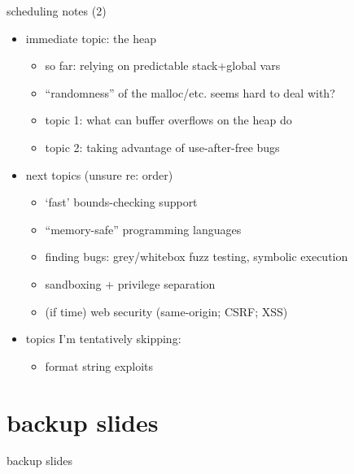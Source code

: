 \begin{frame}{scheduling notes (2)}
    \begin{itemize}
    \item immediate topic: the heap
        \begin{itemize}
        \item so far: relying on predictable stack+global vars
        \item ``randomness'' of the malloc/etc. seems hard to deal with?
        \item topic 1: what can buffer overflows on the heap do
        \item topic 2: taking advantage of use-after-free bugs
        \end{itemize}
    \item next topics (unsure re: order)
        \begin{itemize}
        \item `fast' bounds-checking support
        \item ``memory-safe'' programming languages
        \item finding bugs: grey/whitebox fuzz testing, symbolic execution
        \item sandboxing + privilege separation
        \item (if time) web security (same-origin; CSRF; XSS)
        \end{itemize}
    \item topics I'm tentatively skipping:
        \begin{itemize}
        \item format string exploits
        \end{itemize}
    \end{itemize}
\end{frame}

 





\section{backup slides}
\begin{frame}{backup slides}
\end{frame}


